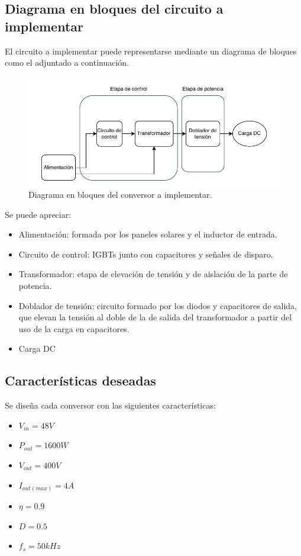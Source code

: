 \subsection{Diagrama en bloques del circuito a implementar}

El circuito a implementar puede representarse mediante un diagrama de bloques como el adjuntado a continuación.

\begin{figure}
	\centering
	\includegraphics[width=0.8\linewidth]{img/bloques_un_conversor}
	\caption{Diagrama en bloques del conversor a implementar.}
	\label{fig:bloquesunconversor}
\end{figure}

Se puede apreciar:

\begin{itemize}
	\item Alimentación: formada por los paneles solares y el inductor de entrada.
	\item Circuito de control: IGBTs junto con capacitores y señales de disparo.
	\item Transformador: etapa de elevación de tensión y de aislación de la parte de potencia.
	\item Doblador de tensión: circuito formado por los diodos y capacitores de salida, que elevan la tensión al doble de la de salida del transformador a partir del uso de la carga en capacitores.
	\item Carga DC
\end{itemize}


\subsection{Características deseadas}

Se diseña cada conversor con las siguientes características:

\begin{itemize}
	\item $V_{in}=48V$
	\item $P_{out}=1600W$
	\item $V_{out}=400V$
	\item $I_{out(max)}=4A$
	\item $\eta =0.9$
	\item $D=0.5$
	\item $f_s=50kHz$
\end{itemize}

